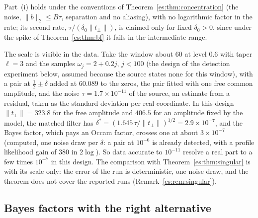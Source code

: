 Part~(i) holds under the conventions of Theorem~\ref{es:thm:concentration} (the noise, $\|b\|_2\le B\tau$, separation and no aliasing), with no logarithmic factor in the rate; its second rate, $\tau/(\delta_0\|t_\perp\|)$, is claimed only for fixed $\delta_0>0$, since under the spike of Theorem~\ref{es:thm:bf} it fails in the intermediate range.

The scale is visible in the data. Take the window about $60$ at level $0.6$ with taper $\ell=3$ and the samples $\omega_j=2+0.2j$, $j<100$ (the design of the detection experiment below, assumed because the source states none for this window), with a pair at $\tfrac12\pm\delta$ added at $60.089$ to the zeros, the pair fitted with one free common amplitude, and the noise $\tau=1.7\times10^{-11}$ of the source, an estimate from a residual, taken as the standard deviation per real coordinate. In this design $\|t_\perp\|=323.8$ for the free amplitude and $406.5$ for an amplitude fixed by the model, the matched filter has $\delta^*=(1.645\,\tau/\|t_\perp\|)^{1/2}=2.9\times10^{-7}$, and the Bayes factor, which pays an Occam factor, crosses one at about $3\times10^{-7}$ (computed, one noise draw per $\delta$: a pair at $10^{-6}$ is already detected, with a profile likelihood gain of $380$ in $2\log$). So data accurate to $10^{-11}$ resolve a real part to a few times $10^{-7}$ in this design. The comparison with Theorem~\ref{es:thm:singular} is with its scale only: the error of the run is deterministic, one noise draw, and the theorem does not cover the reported runs (Remark~\ref{es:rem:singular}).

\subsection{Bayes factors with the right alternative}


